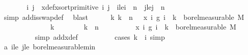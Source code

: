 \begin{isabellebody}
\ \ \ \ \isamarkupfalse%
\ \isamarkupfalse%
\ i\ j\ \ x{\isacharunderscore}{\kern0pt}def{\isacharcolon}{\kern0pt}{\isachardoublequoteopen}x{\isacharequal}{\kern0pt}sort{\isacharunderscore}{\kern0pt}primitive\ i\ j{\isachardoublequoteclose}\ \ i{\isacharunderscore}{\kern0pt}le{\isacharcolon}{\kern0pt}{\isachardoublequoteopen}i\ {\isacharless}{\kern0pt}\ n{\isachardoublequoteclose}\ \ j{\isacharunderscore}{\kern0pt}le{\isacharcolon}{\kern0pt}{\isachardoublequoteopen}j\ {\isacharless}{\kern0pt}\ n{\isachardoublequoteclose}\isanewline
\ \ \ \ \ \ \isamarkupfalse%
\ {\isacharparenleft}{\kern0pt}simp\ add{\isacharcolon}{\kern0pt}is{\isacharunderscore}{\kern0pt}swap{\isacharunderscore}{\kern0pt}def{\isacharparenright}{\kern0pt}\ \isamarkupfalse%
\ blast\isanewline
\ \ \ \ \isamarkupfalse%
\ {\isachardoublequoteopen}{\isasymAnd}k{\isachardot}{\kern0pt}\ k\ {\isacharless}{\kern0pt}\ n\ {\isasymLongrightarrow}\ {\isacharparenleft}{\kern0pt}{\isasymlambda}{\isasymomega}{\isachardot}{\kern0pt}\ x\ {\isacharparenleft}{\kern0pt}{\isasymlambda}i{\isachardot}{\kern0pt}\ g\ i\ {\isasymomega}{\isacharparenright}{\kern0pt}\ k{\isacharparenright}{\kern0pt}\ {\isasymin}\ borel{\isacharunderscore}{\kern0pt}measurable\ M{\isachardoublequoteclose}\isanewline
\ \ \ \ \isamarkupfalse%
\ {\isacharminus}{\kern0pt}\isanewline
\ \ \ \ \ \ \isamarkupfalse%
\ k\isanewline
\ \ \ \ \ \ \isamarkupfalse%
\ {\isachardoublequoteopen}k\ {\isacharless}{\kern0pt}\ n{\isachardoublequoteclose}\isanewline
\ \ \ \ \ \ \isamarkupfalse%
\ {\isachardoublequoteopen}\ {\isacharparenleft}{\kern0pt}{\isasymlambda}{\isasymomega}{\isachardot}{\kern0pt}\ x\ {\isacharparenleft}{\kern0pt}{\isasymlambda}i{\isachardot}{\kern0pt}\ g\ i\ {\isasymomega}{\isacharparenright}{\kern0pt}\ k{\isacharparenright}{\kern0pt}\ {\isasymin}\ borel{\isacharunderscore}{\kern0pt}measurable\ M{\isachardoublequoteclose}\isanewline
\ \ \ \ \ \ \ \ \isamarkupfalse%
\ {\isacharparenleft}{\kern0pt}simp\ add{\isacharcolon}{\kern0pt}x{\isacharunderscore}{\kern0pt}def{\isacharparenright}{\kern0pt}\isanewline
\ \ \ \ \ \ \ \ \isamarkupfalse%
\ {\isacharparenleft}{\kern0pt}cases\ {\isachardoublequoteopen}k\ {\isacharequal}{\kern0pt}\ i{\isachardoublequoteclose}{\isacharcomma}{\kern0pt}\ simp{\isacharparenright}{\kern0pt}\isanewline
\ \ \ \ \ \ \ \ \isamarkupfalse%
\ a\ i{\isacharunderscore}{\kern0pt}le\ j{\isacharunderscore}{\kern0pt}le\ borel{\isacharunderscore}{\kern0pt}measurable{\isacharunderscore}{\kern0pt}min\ \isamarkupfalse%

\end{isabellebody}

